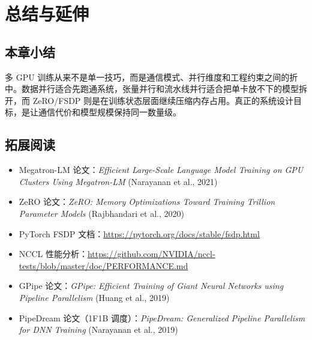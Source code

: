 \section{总结与延伸}

\subsection{本章小结}
多 GPU 训练从来不是单一技巧，而是通信模式、并行维度和工程约束之间的折中。数据并行适合先跑通系统，张量并行和流水线并行适合把单卡放不下的模型拆开，而 ZeRO/FSDP 则是在训练状态层面继续压缩内存占用。真正的系统设计目标，是让通信代价和模型规模保持同一数量级。

\subsection{拓展阅读}

\begin{itemize}
    \item Megatron-LM 论文：\textit{Efficient Large-Scale Language Model Training on GPU Clusters Using Megatron-LM} (Narayanan et al., 2021)
    \item ZeRO 论文：\textit{ZeRO: Memory Optimizations Toward Training Trillion Parameter Models} (Rajbhandari et al., 2020)
    \item PyTorch FSDP 文档：\url{https://pytorch.org/docs/stable/fsdp.html}
    \item NCCL 性能分析：\url{https://github.com/NVIDIA/nccl-tests/blob/master/doc/PERFORMANCE.md}
    \item GPipe 论文：\textit{GPipe: Efficient Training of Giant Neural Networks using Pipeline Parallelism} (Huang et al., 2019)
    \item PipeDream 论文（1F1B 调度）：\textit{PipeDream: Generalized Pipeline Parallelism for DNN Training} (Narayanan et al., 2019)
\end{itemize}


